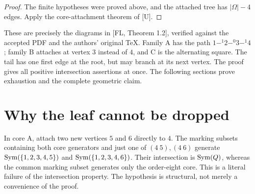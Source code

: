 \begin{proof}
The finite hypotheses were proved above, and the attached tree has
$|\Omega|-4$ edges. Apply the core-attachment theorem of [U].
\end{proof}

These are precisely the diagrams in [FL, Theorem 1.2], verified against
the accepted PDF and the authors' original TeX. Family A has the path
$1\mathbin{-}^{1}2\mathbin{-}^{0}3\mathbin{-}^{1}4$; family B
attaches at vertex $3$ instead of $4$, and C is the alternating square.
The tail has one first edge at the root, but may branch at its next
vertex. The proof gives all positive intersection assertions at once.
The following sections prove exhaustion and the complete geometric claim.

\section{Why the leaf cannot be dropped}
In core A, attach two new vertices $5$ and $6$ directly to $4$.
The marking subsets containing both core generators and just one of
$(4\ 5),(4\ 6)$ generate $\operatorname{Sym}(\{1,2,3,4,5\})$ and
$\operatorname{Sym}(\{1,2,3,4,6\})$. Their intersection is $\operatorname{Sym}(Q)$,
whereas the common marking subset generates only the order-eight
core. This is a literal failure of the intersection property.
The hypothesis is structural, not merely a convenience of the proof.

